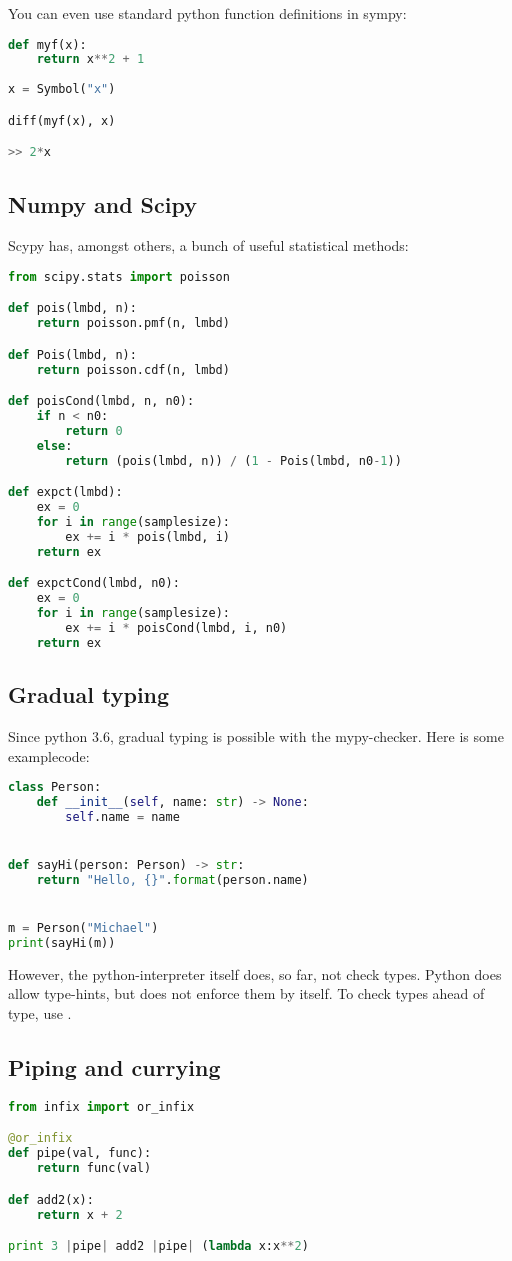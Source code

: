 You can even use standard python function  definitions in sympy:

\begin{lstlisting}[language=python]
def myf(x):
    return x**2 + 1
    
x = Symbol("x")

diff(myf(x), x)

>> 2*x
\end{lstlisting}

\subsection{Numpy and Scipy}
Scypy has, amongst others, a bunch of useful statistical methods: 
\begin{lstlisting}[language=python]
from scipy.stats import poisson

def pois(lmbd, n):
    return poisson.pmf(n, lmbd)

def Pois(lmbd, n):
    return poisson.cdf(n, lmbd)

def poisCond(lmbd, n, n0):
    if n < n0:
        return 0
    else:
        return (pois(lmbd, n)) / (1 - Pois(lmbd, n0-1))

def expct(lmbd):
    ex = 0
    for i in range(samplesize):
        ex += i * pois(lmbd, i)
    return ex

def expctCond(lmbd, n0):
    ex = 0
    for i in range(samplesize):
        ex += i * poisCond(lmbd, i, n0)
    return ex
\end{lstlisting}


\subsection{Gradual typing}
Since python 3.6, gradual typing is possible with the mypy-checker. 
Here is some examplecode:
\begin{lstlisting}[language=python]
class Person:
    def __init__(self, name: str) -> None:
        self.name = name


def sayHi(person: Person) -> str:
    return "Hello, {}".format(person.name)


m = Person("Michael")
print(sayHi(m))
\end{lstlisting}

However, the python-interpreter itself does, so far, not check types. Python does allow type-hints, but does not enforce them by itself. To check types ahead of type, use .

\subsection{Piping and currying}
\begin{lstlisting}[language=python]
from infix import or_infix

@or_infix
def pipe(val, func):
    return func(val)

def add2(x):
    return x + 2

print 3 |pipe| add2 |pipe| (lambda x:x**2)
\end{lstlisting}

